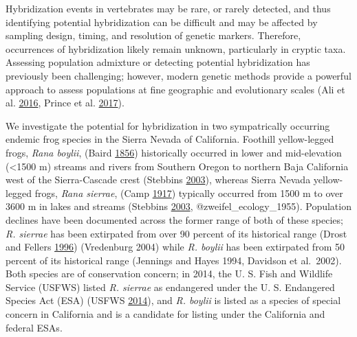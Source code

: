 \documentclass[proquest,12pt,final]{ucthesis-CA2012} %
\begin{document}
\begin{ucmainmatter}
Hybridization events in vertebrates may be rare, or rarely detected, and
thus identifying potential hybridization can be difficult and may be
affected by sampling design, timing, and resolution of genetic markers.
Therefore, occurrences of hybridization likely remain unknown,
particularly in cryptic taxa. Assessing population admixture or
detecting potential hybridization has previously been challenging;
however, modern genetic methods provide a powerful approach to assess
populations at fine geographic and evolutionary scales (Ali et al.
\protect\hyperlink{ref-ali_rad_2016}{2016}, Prince et al.
\protect\hyperlink{ref-prince_evolutionary_2017}{2017}).

We investigate the potential for hybridization in two sympatrically
occurring endemic frog species in the Sierra Nevada of California.
Foothill yellow-legged frogs, \emph{Rana boylii}, (Baird
\protect\hyperlink{ref-baird_descriptions_1856}{1856}) historically
occurred in lower and mid-elevation (\textless{}1500 m) streams and
rivers from Southern Oregon to northern Baja California west of the
Sierra-Cascade crest (Stebbins
\protect\hyperlink{ref-stebbins_field_2003}{2003}), whereas Sierra
Nevada yellow-legged frogs, \emph{Rana sierrae}, (Camp
\protect\hyperlink{ref-camp_notes_1917}{1917}) typically occurred from
1500 m to over 3600 m in lakes and streams (Stebbins
\protect\hyperlink{ref-stebbins_field_2003}{2003},
@zweifel\_ecology\_1955). Population declines have been documented
across the former range of both of these species; \emph{R. sierrae} has
been extirpated from over 90 percent of its historical range (Drost and
Fellers \protect\hyperlink{ref-drost_collapse_1996}{1996}) (Vredenburg
2004) while \emph{R. boylii} has been extirpated from 50 percent of its
historical range (Jennings and Hayes 1994, Davidson et al.~2002). Both
species are of conservation concern; in 2014, the U. S. Fish and
Wildlife Service (USFWS) listed \emph{R. sierrae} as endangered under
the U. S. Endangered Species Act (ESA) (USFWS
\protect\hyperlink{ref-usfws_endangered_2014}{2014}), and \emph{R.
boylii} is listed as a species of special concern in California and is a
candidate for listing under the California and federal ESAs.


\end{ucmainmatter}
\end{document}
